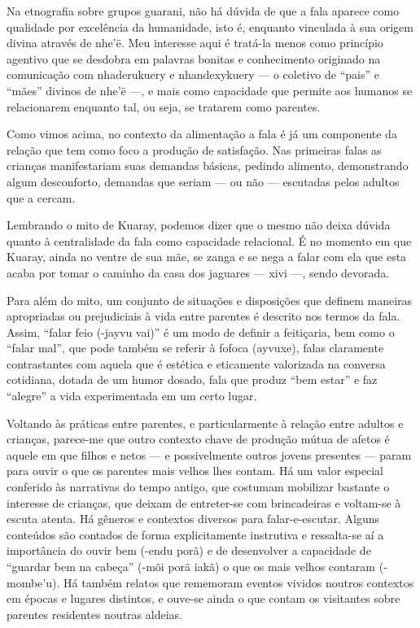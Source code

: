 \documentclass{article}
\begin{document}
Na etnografia sobre grupos guarani, n\~ao h\'a d\'uvida de que a fala
aparece como qualidade por excel\^encia da humanidade, isto \'e,
enquanto vinculada \`a sua origem divina atrav\'es de
nhe{\textquoteright}\"e. Meu interesse aqui \'e trat\'a-la menos como
princ\'ipio agentivo que se desdobra em palavras bonitas e conhecimento
originado na comunica\c{c}\~ao com nhaderukuery e nhandexykuery --- o
coletivo de {\textquotedblleft}pais{\textquotedblright} e
{\textquotedblleft}m\~aes{\textquotedblright} divinos de
nhe{\textquoteright}\"e ---, e mais como capacidade que permite aos
humanos se relacionarem enquanto tal, ou seja, se tratarem como
parentes.

Como vimos acima, no contexto da alimenta\c{c}\~ao a fala \'e j\'a um
componente da rela\c{c}\~ao que tem como foco a produ\c{c}\~ao de
satisfa\c{c}\~ao. Nas primeiras falas as crian\c{c}as manifestariam
suas demandas b\'asicas, pedindo alimento, demonstrando algum
desconforto, demandas que seriam --- ou n\~ao --- escutadas pelos
adultos que a cercam. 

Lembrando o mito de Kuaray, podemos dizer que o mesmo n\~ao deixa
d\'uvida quanto \`a centralidade da fala como capacidade relacional.
\'E no momento em que Kuaray, ainda no ventre de sua m\~ae, se zanga e
se nega a falar com ela que esta acaba por tomar o caminho da casa dos
jaguares --- xivi ---, sendo devorada.

Para al\'em do mito, um conjunto de situa\c{c}\~oes e disposi\c{c}\~oes
que definem maneiras apropriadas ou prejudiciais \`a vida entre
parentes \'e descrito nos termos da fala. Assim,
{\textquotedblleft}falar feio (-jayvu vai){\textquotedblright} \'e um
modo de definir a feiti\c{c}aria, bem como o {\textquotedblleft}falar
mal{\textquotedblright}, que pode tamb\'em se referir \`a fofoca
(ayvuxe), falas claramente contrastantes com aquela que \'e est\'etica
e eticamente valorizada na conversa cotidiana, dotada de um humor
dosado, fala que produz {\textquotedblleft}bem
estar{\textquotedblright} e faz
{\textquotedblleft}alegre{\textquotedblright} a vida experimentada em
um certo lugar.

Voltando \`as pr\'aticas entre parentes, e particularmente \`a
rela\c{c}\~ao entre adultos e crian\c{c}as, parece-me que outro
contexto chave de produ\c{c}\~ao m\'utua de afetos \'e aquele em que
filhos e netos --- e possivelmente outros jovens presentes --- param
para ouvir o que os parentes mais velhos lhes contam. H\'a um valor
especial conferido \`as narrativas do tempo antigo, que costumam
mobilizar bastante o interesse de crian\c{c}as, que deixam de
entreter-se com brincadeiras e voltam-se \`a escuta atenta. H\'a
g\^eneros e contextos diversos para falar-e-escutar. Alguns conte\'udos
s\~ao contados de forma explicitamente instrutiva e ressalta-se a\'i a
import\^ancia do ouvir bem (-endu por\~a) e de desenvolver a capacidade
de {\textquotedblleft}guardar bem na cabe\c{c}a{\textquotedblright}
(-m\~oi por\~a iak\~a) o que os mais velhos contaram
(-mombe{\textquoteright}u). H\'a tamb\'em relatos que rememoram eventos
vividos noutros contextos em \'epocas e lugares distintos, e ouve-se
ainda o que contam os visitantes sobre parentes residentes noutras
aldeias.
\end{document}
